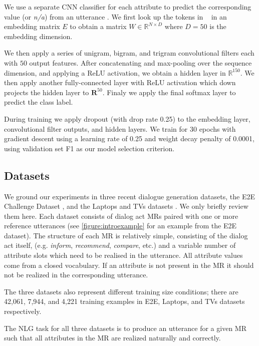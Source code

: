 We use a separate CNN classifier for each attribute to predict
the corresponding value (or \textit{n/a}) from an utterance \descy.
We first look up the tokens in \descy~ in an embedding matrix $E$
to obtain a matrix $W\in\mathbb{R}^{N \times D}$ where $D=50$ is
the embedding dimension.

We then apply a series of unigram, bigram, and trigram convolutional
filters each with $50$ output features.
After concatenating and max-pooling over the sequence dimension,
and applying a ReLU activation,
we obtain a hidden layer in $\mathbb{R}^{150}$.
We then apply another fully-connected layer with ReLU activation
which down projects the hidden layer to $\mathbf{R}^{50}$.
Finaly we apply the final softmax layer to predict the class label.

During training we apply dropout (with drop rate 0.25) to 
the embedding layer, convolutional filter outputs, and hidden
layers. We train for 30 epochs with gradient descent
using  a learning rate of 0.25 and 
weight decay penalty of 0.0001, using validation set F1
as our model selection criterion.



\subsection{Datasets}

We ground our experiments in three recent dialogue generation datasets,
the E2E Challenge Dataset \cite{duvsek2019evaluating}, and the Laptops and 
TVs datasets \cite{wen2016multi}.
We only briefly review them here.
Each dataset consists of dialog act MRs paired with one or more 
reference utterances 
(see \autoref{figure:introexample} for an example from the E2E dataset).
The structure of each MR is relatively simple, consisting of the 
dialog act itself, (e.g. \textit{inform}, \textit{recommend}, 
\textit{compare}, etc.) and a variable number of attribute slots
which need to be realised in the utterance. All attribute values 
come from a closed vocabulary.
If an attribute is not present in the MR it should not be realized in the 
corresponding utterance. 

The three datasets also represent different training size conditions;
there are 42,061, 7,944, and  4,221 training examples in E2E, Laptops,
and TVs datasets respectively.

The NLG task for all three datasets 
is to produce an utterance for a given MR such that all attributes
in the MR are realized naturally and correctly.

